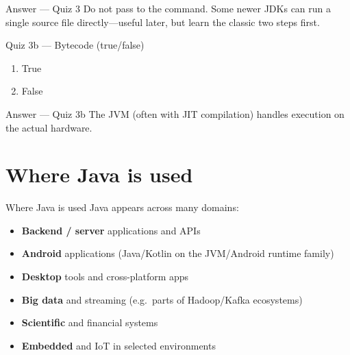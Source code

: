 \documentclass[aspectratio=169,11pt]{beamer}
\begin{document}
    \begin{frame}{Answer --- Quiz 3}
        \vspace{0.4em}
        Do not pass  to the  command. Some newer JDKs can run
        a single source file directly---useful later, but learn the classic two steps first.
    \end{frame}

    \begin{frame}{Quiz 3b --- Bytecode (true/false)}
        \begin{enumerate}
            \item True
            \item False
        \end{enumerate}
        \quizpause
    \end{frame}

    \begin{frame}{Answer --- Quiz 3b}
        \vspace{0.4em}
        The JVM (often with JIT compilation) handles execution on the actual hardware.
    \end{frame}

    \section{Where Java is used}

    \begin{frame}{Where Java is used}
        Java appears across many domains:
        \begin{itemize}
            \item \textbf{Backend / server} applications and APIs
            \item \textbf{Android} applications (Java/Kotlin on the JVM/Android runtime family)
            \item \textbf{Desktop} tools and cross-platform apps
            \item \textbf{Big data} and streaming (e.g.\ parts of Hadoop/Kafka ecosystems)
            \item \textbf{Scientific} and financial systems
            \item \textbf{Embedded} and IoT in selected environments
        \end{itemize}
    \end{frame}
\end{document}
